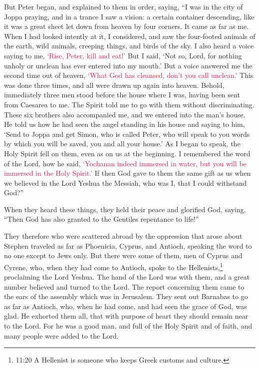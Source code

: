 \myverse{}But Peter began, and explained to them in order, saying,
\myverse{}“I was in the city of Joppa praying, and in a trance I saw a vision: a certain
container descending, like it was a great sheet let down from heaven by four corners. It came as far as
me.
\myverse{}When I had looked intently at it, I considered, and saw the four-footed animals
of the earth, wild animals, creeping things, and birds of the sky.
\myverse{}I also heard a voice saying to me,
\textcolor{crimson}{‘Rise, Peter, kill and eat!’
}
\myverse{}But I said, ‘Not so, Lord, for nothing unholy or unclean has ever entered into
my mouth.’
\myverse{}But a voice answered me the second time out of heaven,
\textcolor{crimson}{‘What God has cleansed, don’t you call unclean.’}
\myverse{}This was done three times, and all were drawn up again into heaven.
\myverse{}Behold, immediately three men stood before the house where I was, having
been sent from Caesarea to me.
\myverse{}The Spirit told me to go with them without discriminating. These six brothers
also accompanied me, and we entered into the man’s house.
\myverse{}He told us how he had seen the angel standing in his house and saying to
him, ‘Send to Joppa and get Simon, who is called Peter,
\myverse{}who will speak to you words by which you will be saved, you and all your
house.’
\myverse{}As I began to speak, the Holy Spirit fell on them, even as on us at the beginning.
\myverse{}I remembered the word of the Lord, how he said,
\textcolor{crimson}{‘Yochanan indeed immersed in water, but you will be immersed in the Holy Spirit.’}
\myverse{}If then God gave to them the same gift as us when we believed in the Lord
Yeshua the Messiah, who was I, that I could withstand God?”

\myverse{}When they heard these things, they held their peace and glorified
God, saying, “Then God has also granted to the Gentiles repentance to life!”

\myverse{}They therefore who were scattered abroad by the oppression that
arose about Stephen traveled as far as Phoenicia, Cyprus, and Antioch, speaking the word to no one except
to Jews only.
\myverse{}But there were some of them, men of Cyprus and Cyrene, who, when they had
come to Antioch, spoke to the Hellenists,\footnote{11:20 A Hellenist is someone who keeps Greek customs and culture.} proclaiming the Lord Yeshua.
\myverse{}The hand of the Lord was with them, and a great number believed and turned
to the Lord.
\myverse{}The report concerning them came to the ears of the assembly which was in
Jerusalem. They sent out Barnabas to go as far as Antioch,
\myverse{}who, when he had come, and had seen the grace of God, was glad. He exhorted
them all, that with purpose of heart they should remain near to the Lord.
\myverse{}For he was a good man, and full of the Holy Spirit and of faith, and many
people were added to the Lord.

